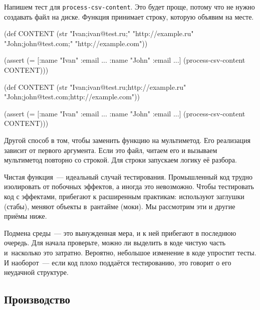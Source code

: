 Напишем тест для \verb|process-csv-content|. Это будет проще, потому что не
нужно создавать файл на диске. Функция принимает строку, которую объявим на
месте.

\ifnarrow

\begin{english}
  \begin{clojure}
(def CONTENT
  (str "Ivan;ivan@test.ru;"
       "http://example.ru"
       \newline
       "John;john@test.com;"
       "http://example.com"))

(assert
  (= [{:name "Ivan" :email ...}
      {:name "John" :email ...}]
     (process-csv-content CONTENT)))
  \end{clojure}
\end{english}

\else

\begin{english}
  \begin{clojure}
(def CONTENT
  (str "Ivan;ivan@test.ru;http://example.ru"
       \newline
       "John;john@test.com;http://example.com"))

(assert (= [{:name "Ivan" :email ...}
            {:name "John" :email ...}]
           (process-csv-content CONTENT)))
  \end{clojure}
\end{english}

\fi

Другой способ в том, чтобы заменить функцию на мультиметод. Его реализация
зависит от первого аргумента. Если это файл, читаем его и вызываем мультиметод
повторно со строкой. Для строки запускаем логику её разбора.

Чистая функция~--- идеальный случай тестирования. Промышленный код трудно
изолировать от побочных эффектов, а иногда это невозможно. Чтобы тестировать код
с эффектами, прибегают к расширенным практикам: используют заглушки (стабы),
меняют объекты в~рантайме (моки). Мы рассмотрим эти и другие приёмы ниже.

Подмена среды~--- это вынужденная мера, и к ней прибегают в последнюю
очередь. Для начала проверьте, можно ли выделить в коде чистую часть и~насколько
это затратно. Вероятно, небольшое изменение в коде упростит тесты. И
наоборот~--- если код плохо поддаётся тестированию, это говорит о его неудачной
структуре.

\subsection{Производство}


